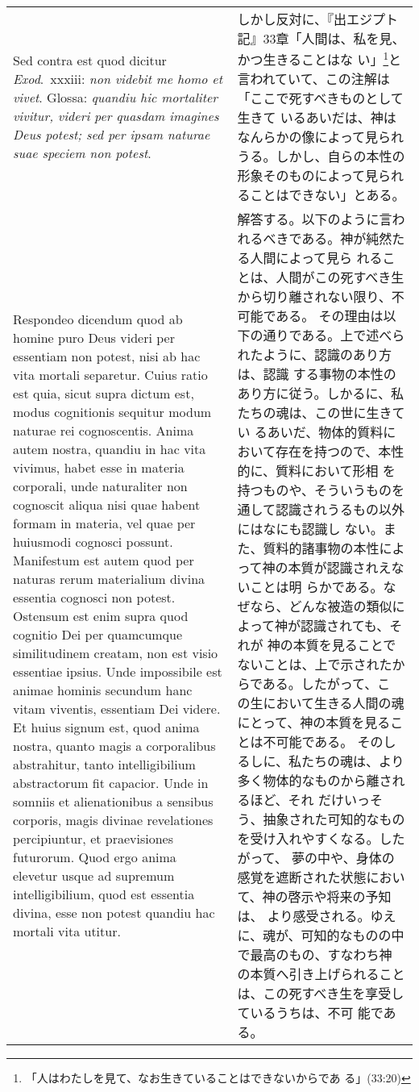 \documentclass[10pt]{jsarticle} %
\begin{document}
\begin{longtable}{p{21em}p{21em}}
{\sc Sed contra est} quod dicitur {\it Exod}.~{\sc xxxiii}: {\it non
videbit me homo et vivet}. Glossa: {\it quandiu hic mortaliter
vivitur, videri per quasdam imagines Deus potest; sed per ipsam
naturae suae speciem non potest}.


&

しかし反対に、『出エジプト記』33章「人間は、私を見、かつ生きることはな
い」\footnote{「人はわたしを見て、なお生きていることはできないからであ
る」(33:20)}と言われていて、この注解は「ここで死すべきものとして生きて
いるあいだは、神はなんらかの像によって見られうる。しかし、自らの本性の
形象そのものによって見られることはできない」とある。


\\

{\sc Respondeo dicendum} quod ab homine puro Deus videri per essentiam
non potest, nisi ab hac vita mortali separetur. Cuius ratio est quia,
sicut supra dictum est, modus cognitionis sequitur modum naturae rei
cognoscentis. Anima autem nostra, quandiu in hac vita vivimus, habet
esse in materia corporali, unde naturaliter non cognoscit aliqua nisi
quae habent formam in materia, vel quae per huiusmodi cognosci
possunt. Manifestum est autem quod per naturas rerum materialium
divina essentia cognosci non potest. Ostensum est enim supra quod
cognitio Dei per quamcumque similitudinem creatam, non est visio
essentiae ipsius. Unde impossibile est animae hominis secundum hanc
vitam viventis, essentiam Dei videre. Et huius signum est, quod anima
nostra, quanto magis a corporalibus abstrahitur, tanto intelligibilium
abstractorum fit capacior. Unde in somniis et alienationibus a
sensibus corporis, magis divinae revelationes percipiuntur, et
praevisiones futurorum. Quod ergo anima elevetur usque ad supremum
intelligibilium, quod est essentia divina, esse non potest quandiu hac
mortali vita utitur.

&


解答する。以下のように言われるべきである。神が純然たる人間によって見ら
れることは、人間がこの死すべき生から切り離されない限り、不可能である。
その理由は以下の通りである。上で述べられたように、認識のあり方は、認識
する事物の本性のあり方に従う。しかるに、私たちの魂は、この世に生きてい
るあいだ、物体的質料において存在を持つので、本性的に、質料において形相
を持つものや、そういうものを通して認識されうるもの以外にはなにも認識し
ない。また、質料的諸事物の本性によって神の本質が認識されえないことは明
らかである。なぜなら、どんな被造の類似によって神が認識されても、それが
神の本質を見ることでないことは、上で示されたからである。したがって、こ
の生において生きる人間の魂にとって、神の本質を見ることは不可能である。
そのしるしに、私たちの魂は、より多く物体的なものから離されるほど、それ
だけいっそう、抽象された可知的なものを受け入れやすくなる。したがって、
夢の中や、身体の感覚を遮断された状態において、神の啓示や将来の予知は、
より感受される。ゆえに、魂が、可知的なものの中で最高のもの、すなわち神
の本質へ引き上げられることは、この死すべき生を享受しているうちは、不可
能である。



\end{longtable}
\end{document}
